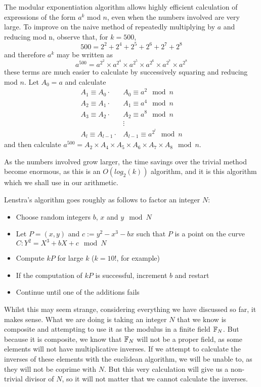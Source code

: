 \begin{definition}
	The modular exponentiation algorithm allows highly efficient calculation of expressions of the form $a^k$ mod $n$, even when the numbers involved are very large. To improve on the naive method of repeatedly multiplying by $a$ and reducing mod n, observe that, for $k=500$,
$$500=2^2+2^4+2^5+2^6+2^7+2^8$$
and therefore $a^k$ may be written as
$$a^{500} = a^{2^{2}} \times a^{2^{4}} \times a^{2^{5}} \times a^{2^{6}} \times a^{2^{7}} \times a^{2^{8}}$$
these terms are much easier to calculate by successively squaring and reducing mod $n$. Let $A_0 = a$ and calculate
\begin{align*}
	A_1\equiv A_0\cdot &A_0 \equiv a^2 \mod n\\
	A_2\equiv A_1\cdot &A_1 \equiv a^4 \mod n\\
	A_3\equiv A_2\cdot &A_2 \equiv a^8 \mod n\\
	&\vdots\\
	A_l\equiv A_{l-1}\cdot &A_{l-1} \equiv a^{2^{l}} \mod n
\end{align*}
and then calculate $a^{500} = A_2 \times A_4 \times A_5 \times A_6 \times A_7 \times A_8 \mod n$.
\end{definition}
As the numbers involved grow larger, the time savings over the trivial method become enormous, as this is an $O(log_2(k))$ algorithm, and it is this algorithm which we shall use in our arithmetic.
\begin{definition}
	Lenstra's algorithm goes roughly as follows to factor an integer $N$:
	\begin{itemize}
		\item Choose random integers $b$, $x$ and $y \mod N$
		\item Let $P = (x,y)$ and $c:=y^2-x^3-bx$ such that $P$ is a point on the curve $C: Y^2 = X^3 +bX + c \mod N$
		\item Compute $kP$ for large $k$ ($k=10!$, for example)
		\item If the computation of $kP$ is successful, increment $b$ and restart
		\item Continue until one of the additions fails
	\end{itemize}
\end{definition}
Whilst this may seem strange, considering everything we have discussed so far, it makes sense. What we are doing is taking an integer $N$ that we know is composite and attempting to use it as the modulus in a finite field $\fp[N]$. But because it is composite, we know that $\fp[N]$ will not be a proper field, as some elements will not have multiplicative inverses. If we attempt to calculate the inverses of these elements with the euclidean algorithm, we will be unable to, as they will not be coprime with $N$. But this very calculation will give us a non-trivial divisor of $N$, so it will not matter that we cannot calculate the inverses.
